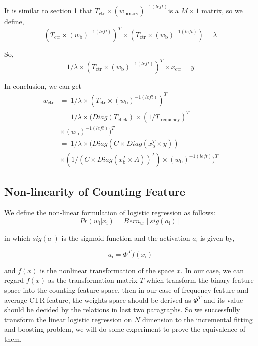 It is similar to section 1 that \(T_{\text{ctr}} \times (w_{\text{binary}})^{-1(left)}\)is a \(M \times 1\) matrix, so we define, 
\begin{equation}
(T_{\text{ctr}} \times (w_{\text{b}})^{-1(left)})^T \times (T_{\text{ctr}} \times (w_{\text{b}})^{-1(left)}) = \lambda
\end{equation}

So, 
\begin{equation}
1/{\lambda} \times (T_{\text{ctr}} \times (w_{\text{b}})^{-1(left)})^T \times x_{\text{ctr}} =  y
\end{equation}

In conclusion, we can get
\begin{equation} 
\begin{split}
w_{\text{ctr}} & =\ 1/{\lambda} \times (T_{\text{ctr}} \times (w_{\text{b}})^{-1(left)})^T \\
& = \ 1/{\lambda} \times (Diag(T_{\text{click}}) \times (1/T_{\text{frequency}} )^T \\ 
& \times (w_{\text{b}})^{-1(left)})^T \\
& = \ 1/{\lambda} \times (Diag(C \times Diag(x_{\text{b}}^T \times y)) \\ 
& \times (1/ (C \times Diag(x_{\text{b}}^T \times A) )^T) \times (w_{\text{b}})^{-1(left)})^T
\end{split}
\end{equation}

\subsection{Non-linearity of Counting Feature}
We define the non-linear formulation of logistic regression as follows:
\begin{equation}
Pr(w_{\text{i}}|x_{\text{i}}) = Bern_{w_{\text{i}}}[sig(a_{\text{i}})]
\end{equation}

in which \(sig(a_{\text{i}})\) is the sigmoid function and the activation \(a_{\text{i}}\) is given by,

\begin{equation}
a_{\text{i}} = \Phi^T f(x_{\text{i}})
\end{equation}

and \(f(x)\) is the nonlinear transformation of the space \(x\). 
In our case, we can regard \(f(x)\) as the transformation matrix \(T\) which transform the binary feature space into the counting feature space, then in our case of frequency feature and average CTR feature, the weights space should be derived as \(\Phi^T \) and its value should be decided by the relations in last two paragraphs. So we successfully transform the linear logistic regression on \(N\) dimension to the incremental fitting and boosting problem, we will do some experiment to prove the equivalence of them.

